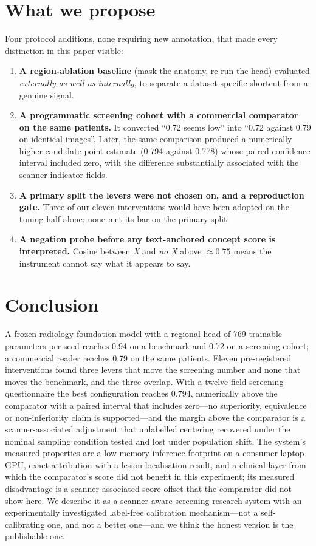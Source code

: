 \documentclass[11pt,a4paper]{article}
\begin{document}
\section{What we propose}
Four protocol additions, none requiring new annotation, that made every distinction in this paper visible:
\begin{enumerate}[leftmargin=1.6em,itemsep=0.1em]
\item \textbf{A region-ablation baseline} (mask the anatomy, re-run the head) evaluated \emph{externally as well as internally}, to separate a dataset-specific shortcut from a genuine signal.
\item \textbf{A programmatic screening cohort with a commercial comparator on the same patients.} It converted ``0.72 seems low'' into ``0.72 against 0.79 on identical images''. Later, the same comparison produced a numerically higher candidate point estimate (0.794 against 0.778) whose paired confidence interval included zero, with the difference substantially associated with the scanner indicator fields.
\item \textbf{A primary split the levers were not chosen on, and a reproduction gate.} Three of our eleven interventions would have been adopted on the tuning half alone; none met its bar on the primary split.
\item \textbf{A negation probe before any text-anchored concept score is interpreted.} Cosine between \emph{X} and \emph{no X} above $\approx0.75$ means the instrument cannot say what it appears to say.
\end{enumerate}

\section{Conclusion}
A frozen radiology foundation model with a regional head of 769 trainable parameters per seed reaches 0.94 on a benchmark and 0.72 on a screening cohort; a commercial reader reaches 0.79 on the same patients. Eleven pre-registered interventions found three levers that move the screening number and none that moves the benchmark, and the three overlap. With a twelve-field screening questionnaire the best configuration reaches 0.794, numerically above the comparator with a paired interval that includes zero---no superiority, equivalence or non-inferiority claim is supported---and the margin above the comparator is a scanner-associated adjustment that unlabelled centering recovered under the nominal sampling condition tested and lost under population shift. The system's measured properties are a low-memory inference footprint on a consumer laptop GPU, exact attribution with a lesion-localisation result, and a clinical layer from which the comparator's score did not benefit in this experiment; its measured disadvantage is a scanner-associated score offset that the comparator did not show here. We describe it as a scanner-aware screening research system with an experimentally investigated label-free calibration mechanism---not a self-calibrating one, and not a better one---and we think the honest version is the publishable one.
\end{document}
